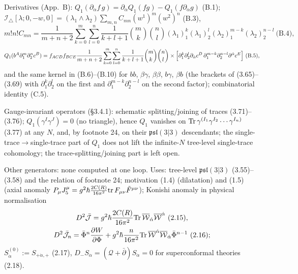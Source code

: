 \documentclass[10pt]{article}
\newcommand{\Itri}{\mathcal I_{\triangle}}
\begin{document}
Derivatives (App.~B): $Q_1(\partial_{\dot\alpha}f\,g)=\partial_{\dot\alpha}Q_1(fg)-Q_1(f\partial_{\dot\alpha}g)$ (B.1); $\Itri[\lambda;0,-w,0]=(\lambda_1\wedge\lambda_2)\sum_{m,n}C_{mn}(w^1)^m(w^2)^n$ (B.3),
\begin{equation*}
m!n!C_{mn}=\frac1{m+n+2}\sum_{k=0}^m\sum_{l=0}^n\frac1{k+l+1}\binom mk\binom nl(\lambda_1)_1^k(\lambda_1)_2^l(\lambda_2)_1^{m-k}(\lambda_2)_2^{n-l}\ \text{(B.4)},
\end{equation*}
\begin{equation*}
Q_1(b^A\partial_1^m\partial_2^nc^B)=f_{ACD}f_{BCE}\frac1{m+n+2}\sum_{k=0}^m\sum_{l=0}^n\frac1{k+l+1}\binom mk\binom nl\\\times\Big[\partial_1^k\partial_2^l\partial_{\dot\alpha}c^D\,\partial_1^{m-k}\partial_2^{n-l}\partial^{\dot\alpha}c^E\Big]\ \text{(B.5)},
\end{equation*}
and the same kernel in (B.6)--(B.10) for $bb$, $\beta\gamma$, $\beta\beta$, $b\gamma$, $\beta b$ (the brackets of (3.65)--(3.69) with $\partial_1^k\partial_2^l$ on the first and $\partial_1^{m-k}\partial_2^{n-l}$ on the second factor); combinatorial identity (C.5).

Gauge-invariant operators (\S3.4.1): schematic splitting/joining of traces (3.71)--(3.76); $Q_1(\gamma^I\gamma^J)=0$ (no triangle), hence $Q_1$ vanishes on ${\rm Tr}\,\gamma^{(I_1}\gamma^{I_2}\cdots\gamma^{I_n)}$ (3.77) at any $N$, and, by footnote 24, on their $\mathfrak{psl}(3|3)$ descendants; the single-trace$\to$single-trace part of $Q_1$ does not lift the infinite-$N$ tree-level single-trace cohomology; the trace-splitting/joining part is left open.

Other generators: none computed at one loop. Uses: tree-level $\mathfrak{psl}(3|3)$ (3.55)--(3.58) and the relation of footnote 24; motivation (1.4) (dilatation) and (1.5) (axial anomaly $P_\mu J^\mu_5=g^2\hbar\frac{2C(R)}{16\pi^2}{\rm tr}\,F_{\mu\nu}\tilde F^{\mu\nu}$); Konishi anomaly in physical normalisation
\begin{gather*}
D^2\bar{\mathcal J}=g^2\hbar\frac{2C(R)}{16\pi^2}{\rm Tr}\,\overline{\mathcal W}_{\dot\alpha}\overline{\mathcal W}^{\dot\alpha}\ \text{(2.15)},\\
D^2\bar{\mathcal J}_n=\bar\Phi^n\frac{\partial W}{\partial\Phi}+g^2\hbar\frac{n}{16\pi^2}{\rm Tr}\,\overline{\mathcal W}^{\dot\alpha}\overline{\mathcal W}_{\dot\alpha}\bar\Phi^{n-1}\ \text{(2.16)};
\end{gather*}
$S^{(0)}_{\dot\alpha}:=S_{+\dot\alpha,+}$ (2.17), $D_-S_{\dot\alpha}=(\mathcal Q+\bar\partial)S_{\dot\alpha}=0$ for superconformal theories (2.18).
\end{document}
